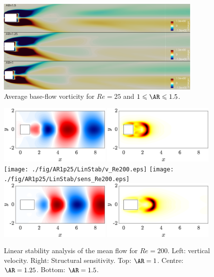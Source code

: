 \begin{figure}
  \centering
  \includegraphics[width=0.9\textwidth]{./fig/AR1s/mean_vort_Re250.png}
  \caption{Average base-flow vorticity for $Re=25$ and $1 \le \AR \le 1.5$.}
  \label{fig:av_bf2}
\end{figure}

\begin{figure}
  \centering
  \includegraphics[width=0.49\textwidth]{./fig/AR1/LinStab/v_Re200.eps}
  \includegraphics[width=0.49\textwidth]{./fig/AR1/LinStab/sens_Re200.eps}
  \texttt{[image: ./fig/AR1p25/LinStab/v\_Re200.eps]}
  \texttt{[image: ./fig/AR1p25/LinStab/sens\_Re200.eps]}
  \includegraphics[width=0.49\textwidth]{./fig/AR1p5/LinStab/v_Re200.eps}
  \includegraphics[width=0.49\textwidth]{./fig/AR1p5/LinStab/sens_Re200.eps}
  \caption{Linear stability analysis of the mean flow for $Re=200$. Left: vertical velocity. Right: Structural sensitivity. Top: $\AR=1$. Centre: $\AR=1.25$. Bottom: $\AR=1.5$.}
  \label{fig:MF_stab3}
\end{figure}

